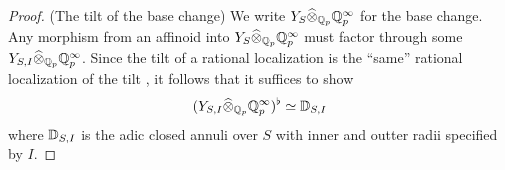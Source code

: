 \documentclass{article}
\begin{document}
\begin{proof}
  (The tilt of the base change)
  We write $Y_{S} \widehat{\otimes}_{\mathbb{Q}_p} \mathbb{Q}_p^\infty$
  for the base change.
  Any morphism from an affinoid into 
  $Y_{S} \widehat{\otimes}_{\mathbb{Q}_p} \mathbb{Q}_p^\infty$
  must factor through some 
  $Y_{S , I} \widehat{\otimes}_{\mathbb{Q}_p} \mathbb{Q}_p^\infty$.
  Since the tilt of a rational localization
  is the ``same'' rational localization of the tilt \cite[Theorem 7.1.1]{SW20},
  it follows that it suffices to show \[
    (Y_{S , I} \widehat{\otimes}_{\mathbb{Q}_p} \mathbb{Q}_p^\infty)^\flat
    \simeq \mathbb{D}_{S , I}
  \]
  where $\mathbb{D}_{S , I}$ is the
  adic closed annuli over $S$ with inner and outter radii specified by $I$.


\end{proof}
\end{document}
